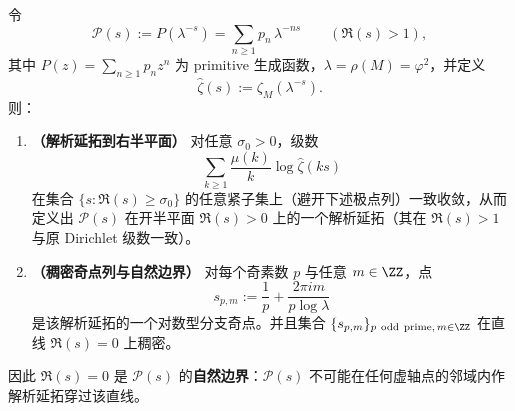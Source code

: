 \begin{theorem}[primitive--Dirichlet 级数的自然边界：\texorpdfstring{$\Re(s)=0$}{Re(s)=0}]\label{thm:real-input-40-primedirichlet-dense-branch}
令
\[
\mathcal{P}(s):=P(\lambda^{-s})=\sum_{n\ge 1}p_n\,\lambda^{-ns}\qquad(\Re(s)>1),
\]
其中 $P(z)=\sum_{n\ge 1}p_n z^n$ 为 primitive 生成函数，$\lambda=\rho(M)=\varphi^2$，并定义
\[
\widehat{\zeta}(s):=\zeta_M(\lambda^{-s}).
\]
则：
\begin{enumerate}
  \item \textbf{（解析延拓到右半平面）} 对任意 $\sigma_0>0$，级数
  \[
  \sum_{k\ge 1}\frac{\mu(k)}{k}\log \widehat{\zeta}(ks)
  \]
  在集合
  \(
  \{s:\Re(s)\ge \sigma_0\}
  \)
  的任意紧子集上（避开下述极点列）一致收敛，从而定义出 $\mathcal{P}(s)$ 在开半平面 $\Re(s)>0$ 上的一个解析延拓（其在 $\Re(s)>1$ 与原 Dirichlet 级数一致）。
  \item \textbf{（稠密奇点列与自然边界）} 对每个奇素数 $p$ 与任意 $m\in\ZZ$，点
  \[
  s_{p,m}:=\frac{1}{p}+\frac{2\pi i m}{p\log\lambda}
  \]
  是该解析延拓的一个对数型分支奇点。并且集合 $\{s_{p,m}\}_{p\ \mathrm{odd\ prime},\,m\in\ZZ}$ 在直线 $\Re(s)=0$ 上稠密。
\end{enumerate}
因此 \(\Re(s)=0\) 是 \(\mathcal{P}(s)\) 的\textbf{自然边界}：\(\mathcal{P}(s)\) 不可能在任何虚轴点的邻域内作解析延拓穿过该直线。
\end{theorem}


